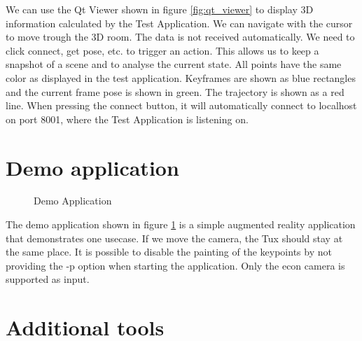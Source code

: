 \documentclass[11pt,a4paper,titlepage,oneside]{report}
\begin{document}
We can use the Qt Viewer shown in figure \ref{fig:qt_viewer} to display 3D information calculated by the Test Application. We can navigate with the cursor to move trough the 3D room. The data is not received automatically. We need to click connect, get pose, etc. to trigger an action. This allows us to keep a snapshot of a scene and to analyse the current state. All points have the same color as displayed in the test application. Keyframes are shown as blue rectangles and the current frame pose is shown in green. The trajectory is shown as a red line. When pressing the connect button, it will automatically connect to localhost on port 8001, where the Test Application is listening on.

\section{Demo application}
\begin{figure}[H]
  \centering
  \qquad
  \caption{Demo Application}\label{fig:demo_application}
\end{figure}

The demo application shown in figure \ref{fig:demo_application} is a simple augmented reality application that demonstrates one usecase. If we move the camera, the Tux should stay at the same place. It is possible to disable the painting of the keypoints by not providing the -p option when starting the application. Only the econ camera is supported as input.

\section{Additional tools}
\end{document}
